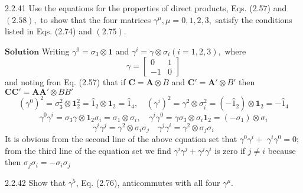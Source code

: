 \documentclass{article}
\begin{document}
\begin{flushleft}
\begin{mybox}{2.2.41}
Use the equations for the properties of direct products, Eqs. (2.57) and $(2.58),$ to show
that the four matrices $\gamma^{\mu}, \mu=0,1,2,3,$ satisfy the conditions listed in Eqs. (2.74) and $(2.75) .$
\end{mybox}


$\boxed{\textbf{Solution}}$  Writing $\gamma^{0}=\sigma_{3} \otimes \mathbf{1}$ and $\gamma^{i}=\gamma \otimes \sigma_{i}(i=1,2,3),$ where
$$
\gamma=\begin{bmatrix}{0} & {1} \\ {-1} & {0}\end{bmatrix}
$$
and noting fron Eq. (2.57) that if $\mathbf{C}=\mathbf{A} \otimes B$ and $\mathbf{C}'=\mathbf{A}' \otimes B'$ then
$\mathbf{C} \mathbf{C}'=\mathbf{A} \mathbf{A}' \otimes B B'$
$$\left(\gamma^{0}\right)^{2}=\sigma_{3}^{2} \otimes \mathbf{1}_{2}^{2}=\hat{1}_{2} \otimes \mathbf{1}_{2}=\hat{1}_{4}, \quad\left(\gamma^{i}\right)^{2}=\gamma^{2} \otimes \sigma_{i}^{2}=\left(-\hat{1}_{2}\right) \otimes \mathbf{1}_{2}=-\hat{1}_{4}$$
$$\gamma^{0} \gamma^{i}=\sigma_{3} \gamma \otimes \mathbf{1}_{2} \sigma_{i}=\sigma_{1} \otimes \sigma_{i}, \quad \gamma^{i} \gamma^{0}=\gamma \sigma_{3} \otimes \sigma_{i} \mathbf{1}_{2}=\left(-\sigma_{1}\right) \otimes \sigma_{i}$$
$$\gamma^{i} \gamma^{j}=\gamma^{2} \otimes \sigma_{i} \sigma_{j} \quad \gamma^{j} \gamma^{i}=\gamma^{2} \otimes \sigma_{j} \sigma_{i}$$
It is obvious from the second line of the above equation set that $\gamma^{0} \gamma^{i}+$
$\gamma^{i} \gamma^{0}=0 ;$ from the third line of the equation set we find $\gamma^{i} \gamma^{j}+\gamma^{j} \gamma^{i}$ is zero if $j \neq i$ because then $\sigma_{j} \sigma_{i}=-\sigma_{i} \sigma_{j}$

\begin{mybox}{2.2.42}
Show that $\gamma^{5}$, Eq. (2.76), anticommutes with all four $\gamma^{\mu}$.
\end{mybox}



\end{flushleft}
\end{document}
